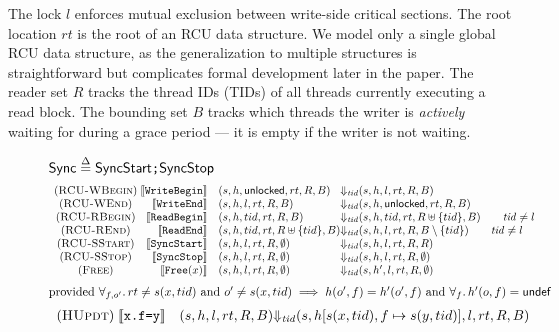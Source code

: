 The lock $l$ enforces mutual exclusion between write-side critical sections.
The root location $rt$ is the root of  an \textsf{RCU} data structure. We model only a single global RCU data structure, as the generalization to multiple structures is straightforward but complicates formal development later in the paper.
The reader set $R$ tracks the thread IDs (TIDs) of all threads currently executing a read block. 
The bounding set $B$ tracks which threads the writer is \emph{actively} waiting for during a grace period --- it is empty if the writer is not waiting.
\begin{figure*}\scriptsize%
  \grammar $\textsf{Sync} \overset{\Delta}{=} \texttt{\textsf{SyncStart};\textsf{SyncStop}}$ %
\[\begin{array}{c@{\;}rl@{\Downarrow_{\mathit{tid}}}ll} 
(\textsc{RCU-WBegin}) & \llbracket\texttt{WriteBegin}\rrbracket & (s,h,\mathsf{unlocked},rt,R,B) &(s,h,l,rt,R,B) & \\
(\textsc{RCU-WEnd}) & \llbracket\texttt{WriteEnd}\rrbracket & (s,h,l,rt,R,B) & (s,h,\mathsf{unlocked},rt,R,B) & \\
(\textsc{RCU-RBegin}) & \llbracket\texttt{ReadBegin}\rrbracket & (s,h,tid,rt,R,B) & (s,h,tid,rt,R\uplus \{tid\},B) \qquad \mathit{tid} \neq l &  \\
(\textsc{RCU-REnd}) & \llbracket\texttt{ReadEnd}\rrbracket & (s,h,tid,rt,R\uplus\{tid\},B) & (s,h,l,rt,R,B\setminus \{tid\}) \qquad  \mathit{tid} \neq l& \\
(\textsc{RCU-SStart}) & \llbracket\texttt{SyncStart}\rrbracket & (s,h,l,rt,R,\emptyset) & (s,h,l,rt,R,R) &\\  %
(\textsc{RCU-SStop}) & \llbracket\texttt{SyncStop}\rrbracket & (s,h,l,rt,R,\emptyset) & (s,h,l,rt,R,\emptyset) &  \\
(\textsc{Free}) & {\llbracket\texttt{Free}(x)\rrbracket} & (s,h,l,rt,R,\emptyset) & (s,h',l,rt,R,\emptyset) &
\end{array}\]
$\textrm{provided}~ \forall_{f,o'}\ldotp rt \neq s(x,tid) \textrm{ and } o' \neq s(x,tid) \implies h(o',f) = h'(o',f) \textrm{ and } \forall_{f}\ldotp h'(o,f)=\textsf{undef}$
\[\begin{array}{c@{\;}rl@{\Downarrow_{\mathit{tid}}}ll} 
(\textsc{HUpdt}) & \llbracket\texttt{x.f=y}\rrbracket   &(s,h,l,rt,R,B)& (s,h[s(x,tid),f \mapsto s(y,tid)],l,rt,R,B) &\\

\end{array}\]
\end{figure*}
